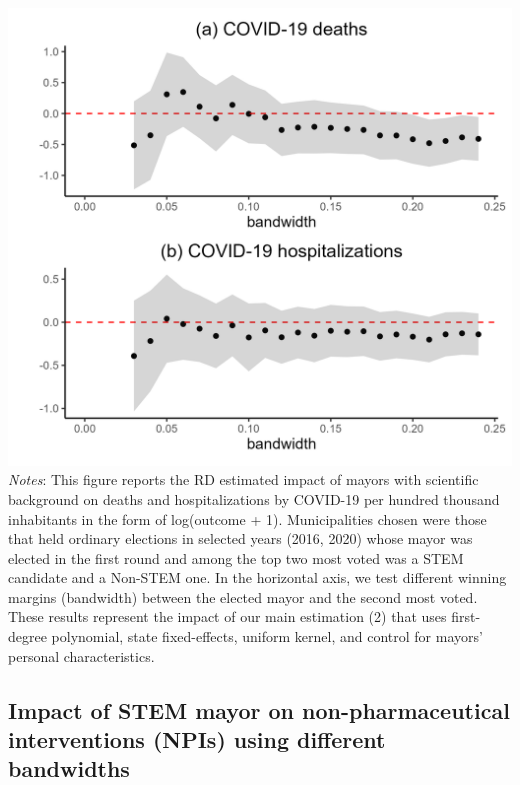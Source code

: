 \documentclass[
  letterpaper,
  DIV=11,
  numbers=noendperiod]{scrartcl}
\begin{document}
\includegraphics{outputs/figures/robust_outcomes.png} \emph{Notes}: This
figure reports the RD estimated impact of mayors with scientific
background on deaths and hospitalizations by COVID-19 per hundred
thousand inhabitants in the form of log(outcome + 1). Municipalities
chosen were those that held ordinary elections in selected years (2016,
2020) whose mayor was elected in the first round and among the top two
most voted was a STEM candidate and a Non-STEM one. In the horizontal
axis, we test different winning margins (bandwidth) between the elected
mayor and the second most voted. These results represent the impact of
our main estimation (2) that uses first-degree polynomial, state
fixed-effects, uniform kernel, and control for mayors' personal
characteristics.

\subsection{Impact of STEM mayor on non-pharmaceutical interventions
(NPIs) using different
bandwidths}\label{impact-of-stem-mayor-on-non-pharmaceutical-interventions-npis-using-different-bandwidths}
\end{document}
